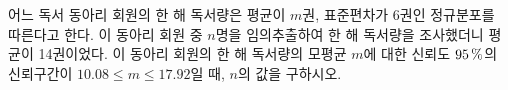 어느 독서 동아리 회원의 한 해 독서량은 평균이 $m$권, 표준편차가 6권인 정규분포를 따른다고 한다. 이 동아리 회원 중 $n$명을 임의추출하여 한 해 독서량을 조사했더니 평균이 14권이었다. 이 동아리 회원의 한 해 독서량의 모평균 $m$에 대한 신뢰도 $95\mkern3mu \%$의 신뢰구간이 $10.08\le m\le 17.92$일 때, $n$의 값을 구하시오. 
